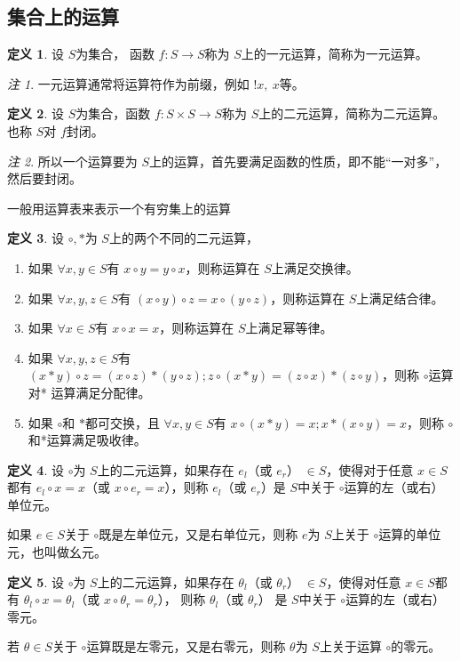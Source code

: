\documentclass[a4paper,11pt]{article}%
\theoremstyle{remark}
\newtheorem*{remark}{注}
\theoremstyle{remark}
\theoremstyle{definition}
\theoremstyle{definition}
\newtheorem*{definition}{定义}
\theoremstyle{plain}
\begin{document}
\subsection{集合上的运算}
\begin{definition}
    设 $S$为集合， 函数 $f:S\rightarrow S$称为 $S$上的一元运算，简称为一元运算。
\end{definition}
\begin{remark}
    一元运算通常将运算符作为前缀，例如 $!x,~x$等。
\end{remark}
\begin{definition}
    设 $S$为集合，函数 $f:S\times S\rightarrow S$称为 $S$上的二元运算，简称为二元运算。也称 $S$对 $f$封闭。
\end{definition}
\begin{remark}
    所以一个运算要为 $S$上的运算，首先要满足函数的性质，即不能“一对多”，然后要封闭。
\end{remark}
一般用运算表来表示一个有穷集上的运算
\begin{definition}
    设 $\circ,*$为 $S$上的两个不同的二元运算， 
    \begin{enumerate}
        \item 如果 $\forall x,y \in S$有 $x\circ y=y\circ x$，则称运算在 $S$上满足交换律。
        \item 如果 $\forall x,y,z\in S$有 $(x\circ y)\circ z=x\circ(y\circ z)$，则称运算在 $S$上满足结合律。
        \item 如果 $\forall x\in S$有 $x\circ x=x$，则称运算在 $S$上满足幂等律。
        \item 如果 $\forall x,y,z\in S$有 $(x*y)\circ z = (x\circ z)*(y\circ z);z\circ(x*y)=(z\circ x)*(z\circ y)$，则称 $\circ$运算对* 运算满足分配律。
        \item 如果 $\circ$和 $*$都可交换，且 $\forall x,y\in S$有 $x\circ(x*y)=x;x*(x\circ y)=x$，则称 $\circ$和*运算满足吸收律。
    \end{enumerate}
\end{definition}
\begin{definition}
    设 $\circ$为 $S$上的二元运算，如果存在 $e_l$（或 $e_r$） $\in S$，使得对于任意 $x\in S$都有  $e_l\circ x=x$（或  $x\circ e_r=x$），则称 $e_l$（或 $e_r$）是 $S$中关于 $\circ$运算的左（或右）单位元。
    
    如果 $e\in S$关于 $\circ$既是左单位元，又是右单位元，则称 $e$为 $S$上关于 $\circ$运算的单位元，也叫做幺元。
\end{definition}
\begin{definition}
    设 $\circ$为 $S$上的二元运算，如果存在 $\theta_l$（或 $\theta_r$） $\in S$，使得对任意 $x\in S$都有 $\theta_l\circ x=\theta_l$（或  $x\circ \theta_r=\theta_r$）， 则称 $\theta_l$（或  $\theta_r$）
    是 $S$中关于 $\circ$运算的左（或右）零元。

    若 $\theta\in S$关于 $\circ$运算既是左零元，又是右零元，则称 $\theta$为 $S$上关于运算 $\circ$的零元。
\end{definition}
\end{document}
